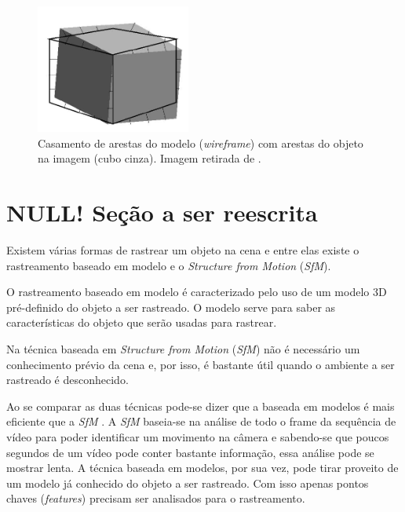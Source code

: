 \begin{figure}[!ht]
\centering\includegraphics[width=2in]{monografia/cubo_pipeline_drummond}
\caption{Casamento de arestas do modelo (\emph{wireframe}) com arestas do objeto na imagem (cubo cinza). Imagem retirada de \cite{drummondecipolla}.}
\label{cubo_pipeline_drummond}
\end{figure}

\section{NULL! Seção a ser reescrita}

Existem várias formas de rastrear um objeto na cena \cite{teichrieb2007survey} e entre elas existe o rastreamento baseado em modelo e o \emph{Structure from Motion} (\emph{SfM}).

O rastreamento baseado em modelo é caracterizado pelo uso de um modelo 3D pré-definido do objeto a ser rastreado. O modelo serve para saber as características do objeto que serão usadas para rastrear.

Na técnica baseada em \emph{Structure from Motion} (\emph{SfM}) \cite{teichrieb2007survey} não é necessário um conhecimento prévio da cena e, por isso, é bastante útil quando o ambiente a ser rastreado é desconhecido.

Ao se comparar as duas técnicas pode-se dizer que a baseada em modelos é mais eficiente que a \emph{SfM} \cite{drummondecipolla}. A \emph{SfM} baseia-se na análise de todo o frame da sequência de vídeo para poder identificar um movimento na câmera e sabendo-se que poucos segundos de um vídeo pode conter bastante informação, essa análise pode se mostrar lenta. A técnica baseada em modelos, por sua vez, pode tirar proveito de um modelo já conhecido do objeto a ser rastreado. Com isso apenas pontos chaves (\emph{features}) precisam ser analisados para o rastreamento.

